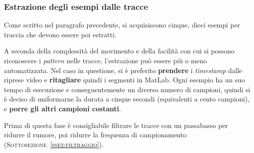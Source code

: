 \subsubsection{Estrazione degli esempi dalle tracce}
Come scritto nel paragrafo precedente,
si acquisiscono cinque, dieci esempi per traccia
che devono essere poi estratti.

A seconda della complessità del movimento e
della facilità con cui si possono riconoscere i \textit{pattern} nelle tracce,
l'estrazione può essere più o meno automatizzata.
Nel caso in questione, si è preferito \textbf{prendere} i \textit{timestamp}
dalle riprese video e \textbf{ritagliare} quindi i segmenti in MatLab.
Ogni esempio ha un suo tempo di esecuzione e
conseguentemente un diverso numero di campioni,
quindi si è deciso di uniformarne la durata a cinque secondi
(equivalenti a cento campioni),
e \textbf{porre gli altri campioni costanti}.

Prima di questa fase è consigliabile filtrare le tracce con un passabasso per ridurre il rumore,
poi ridurre la frequenza di campionamento (\textsc{Sottosezione~\ref{ssez:filtraggio}}).
